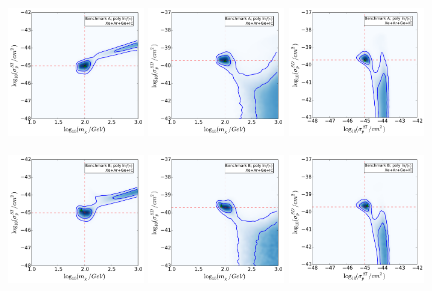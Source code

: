 \begin{figure}[p!]
  \centering
  \includegraphics[trim=0.2cm 0.2cm 0.2cm 0.2cm, clip,width=0.32\textwidth]{NT/BenchmarkA_poly-mx_sigsi.pdf}
  \includegraphics[trim=0.2cm 0.2cm 0.2cm 0.2cm, clip,width=0.32\textwidth]{NT/BenchmarkA_poly-mx_sigsd.pdf}
  \includegraphics[trim=0.2cm 0.2cm 0.2cm 0.2cm, clip,width=0.32\textwidth]{NT/BenchmarkA_poly-sigsi_sigsd.pdf}

  \includegraphics[trim=0.2cm 0.2cm 0.2cm 0.2cm, clip,width=0.32\textwidth]{NT/BenchmarkB_poly-mx_sigsi.pdf}
  \includegraphics[trim=0.2cm 0.2cm 0.2cm 0.2cm, clip,width=0.32\textwidth]{NT/BenchmarkB_poly-mx_sigsd.pdf}
  \includegraphics[trim=0.2cm 0.2cm 0.2cm 0.2cm, clip,width=0.32\textwidth]{NT/BenchmarkB_poly-sigsi_sigsd.pdf}


\end{figure}
